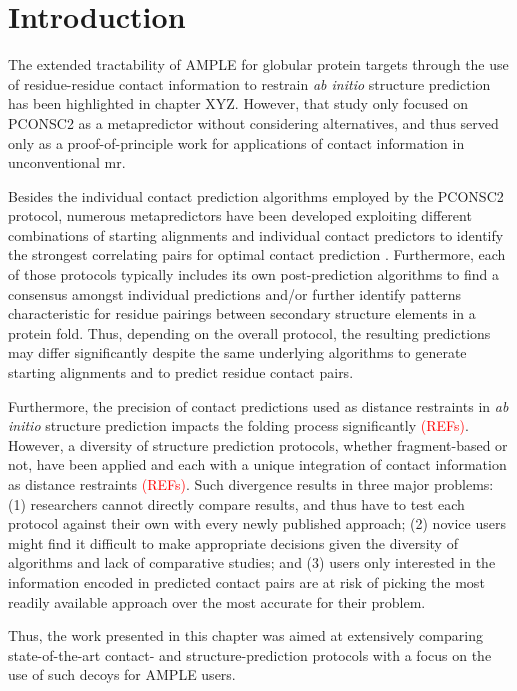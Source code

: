 \section{Introduction}
The extended tractability of AMPLE for globular protein targets through the use of residue-residue contact information to restrain \textit{ab initio} structure prediction has been highlighted in chapter XYZ. However, that study only focused on PCONSC2 as a metapredictor without considering alternatives, and thus served only as a proof-of-principle work for applications of contact information in unconventional \gls{mr}.

Besides the individual contact prediction algorithms employed by the PCONSC2 protocol, numerous metapredictors have been developed exploiting different combinations of starting alignments and individual contact predictors to identify the strongest correlating pairs for optimal contact prediction \cite{Kamisetty2013-bs, Skwark2014-mu, Jones2015-wp, Ma2015-qd, He2017-if, Michel2017-lh, Wang2017-ox}. Furthermore, each of those protocols typically includes its own post-prediction algorithms to find a consensus amongst individual predictions and/or further identify patterns characteristic for residue pairings between secondary structure elements in a protein fold. Thus, depending on the overall protocol, the resulting predictions may differ significantly despite the same underlying algorithms to generate starting alignments and to predict residue contact pairs.

Furthermore, the precision of contact predictions used as distance restraints in \textit{ab initio} structure prediction impacts the folding process significantly \textcolor{red}{(REFs)}. However, a diversity of structure prediction protocols, whether fragment-based or not, have been applied and each with a unique integration of contact information as distance restraints \textcolor{red}{(REFs)}. Such divergence results in three major problems: (1) researchers cannot directly compare results, and thus have to test each protocol against their own with every newly published approach; (2) novice users might find it difficult to make appropriate decisions given the diversity of algorithms and lack of comparative studies; and (3) users only interested in the information encoded in predicted contact pairs are at risk of picking the most readily available approach over the most accurate for their problem.

Thus, the work presented in this chapter was aimed at extensively comparing state-of-the-art contact- and structure-prediction protocols with a focus on the use of such decoys for AMPLE users.

